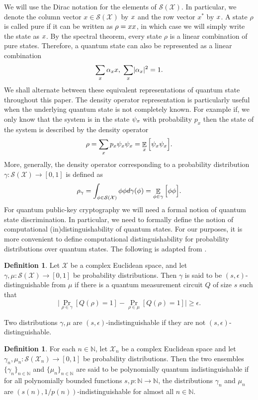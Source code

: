\documentclass[11pt]{article}
\theoremstyle{plain}
\theoremstyle{definition}
\newtheorem{definition}[theorem]{Definition}
\DeclareMathOperator{\E}{\mathbb{E}}
\DeclarePairedDelimiter{\abs}{\lvert}{\rvert}
\let\ket\relax
\DeclarePairedDelimiter{\ket}{\lvert}{\rangle}
\let\bra\relax
\DeclarePairedDelimiter{\bra}{\langle}{\rvert}
\def\N{\mathbb{N}}
\def\X{\mathcal{X}}
\def\SX{\mathcal{S(X)}}
\begin{document}
We will use the Dirac notation for the elements of $\SX$. In particular, we denote the column vector $x \in \SX$ by $\ket{x}$ and the row vector $x^*$ by $\bra{x}$. A state $\rho$ is called pure if it can be written as $\rho = \ket{x}\bra{x}$, in which case we will simply write the state as $\ket{x}$. By the spectral theorem, every state $\rho$ is a linear combination of pure states. Therefore, a quantum state can also be represented as a linear combination
\[ \sum_{x} \alpha_x \ket{x}, \hspace*{1mm} \sum_{x} \abs{\alpha_x}^2 = 1. \]
We shall alternate between these equivalent representations of quantum state throughout this paper. The density operator representation is particularly useful when the underlying quantum state is not completely known. For example if, we only know that the system is in the state $\ket{\psi_x}$ with probability $p_x$ then the state of the system is described by the density operator
\[ \rho = \sum_{x} p_x \ket{\psi_x}\bra{\psi_x} = \E_x \Big[ \ket{\psi_x} \bra{\psi_x} \Big]. \]
More, generally, the density operator corresponding to a probability distribution $\gamma: \SX \rightarrow [0, 1]$ is defined as
\[ \rho_\gamma = \int_{\ket{\phi} \in \SX} \ket{\phi}\bra{\phi} d\gamma(\ket{\phi}) = \E_{\ket{\phi} \in \gamma} \Big[ \ket{\phi}\bra{\phi} \Big]. \]
For quantum public-key cryptography we will need a formal notion of quantum state discrimination. In particular, we need to formally define the notion of computational (in)distinguishability of quantum states. For our purposes, it is more convenient to define computational distinguishability for probability distributions over quantum states. The following is adapted from \cite[\S 3.3]{watrous2009zero}.
\begin{definition}
    Let $\X$ be a complex Euclidean space, and let $\gamma, \mu: \SX \rightarrow [0, 1]$ be probability distributions. Then $\gamma$ is said to be $(s, \epsilon)$-distinguishable from $\mu$ if there is a quantum measurement circuit $Q$ of size $s$ such that
    \[ \Big| \Pr_{\rho \in \gamma}[Q(\rho) = 1] - \Pr_{\rho \in \mu}[Q(\rho) = 1] \Big| \ge \epsilon. \]
\end{definition} 
Two distributions $\gamma, \mu$ are $(s, \epsilon)$-indistinguishable if they are not $(s, \epsilon)$-distinguishable.
\begin{definition}
    For each $n \in \N$, let $\X_n$ be a complex Euclidean space and let $\gamma_n, \mu_n: \mathcal{S}(\X_n) \rightarrow [0, 1]$ be probability distributions. Then the two ensembles $\{ \gamma_n \}_{n \in \N}$ and $\{ \mu_n \}_{n \in \N}$ are said to be polynomially quantum indistinguishable if for all polynomially bounded functions $s, p: \N \rightarrow \N$, the distributions $\gamma_n$ and $\mu_n$ are $(s(n), 1 / p(n))$-indistinguishable for almost all $n \in \N$.
\end{definition}
\end{document}
